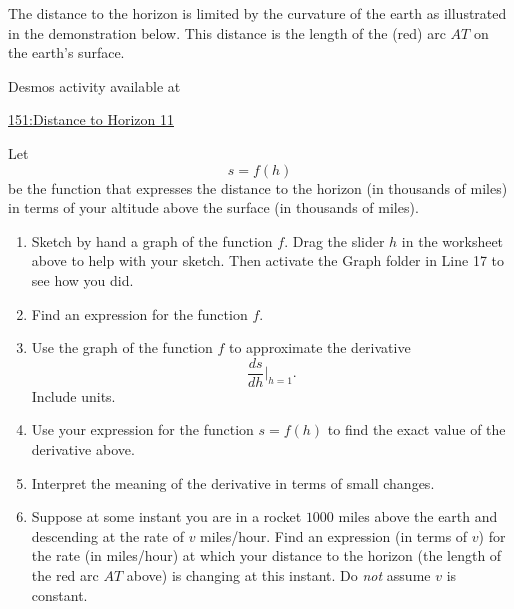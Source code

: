 \documentclass{ximera}
\begin{document}
\begin{question}  \label{Qthhvhrdfgbyt}
The distance to the horizon is limited by the curvature of the earth as illustrated in the demonstration below. This distance is the length of the (red) arc $AT$ on the earth's surface. 


 
\begin{onlineOnly}
    \begin{center}
\end{center}
\end{onlineOnly}

Desmos activity available at

\href{https://www.desmos.com/calculator/8qwt6mfirt}{151:Distance to Horizon 11}


Let 
\[
    s = f(h)
\]
be the function that expresses the distance to the horizon (in thousands of miles) in terms of your altitude above the surface (in thousands of miles).

\begin{enumerate}

\item Sketch by hand a graph of the function $f$. Drag the slider $h$ in the worksheet above to help with your sketch. Then activate the Graph folder in Line 17 to see how you did.

\item Find an expression for the function $f$.

\item Use the graph of the function $f$ to approximate the derivative
\[
       \frac{ds}{dh}\Big|_{h=1} .
\]
Include units.

\item Use your expression for the function $s = f(h)$ to find the exact value of the derivative above.

\item Interpret the meaning of the derivative in terms of small changes.

\item Suppose at some instant you are in a rocket $1000$ miles above the earth and descending at the rate of $v$ miles/hour.
Find an expression (in terms of $v$) for the rate (in miles/hour) at which your distance to the horizon (the length of the red arc $AT$ above) is changing at this instant.  Do \emph{not} assume $v$ is constant.

\end{enumerate}

\end{question}
\end{document}
